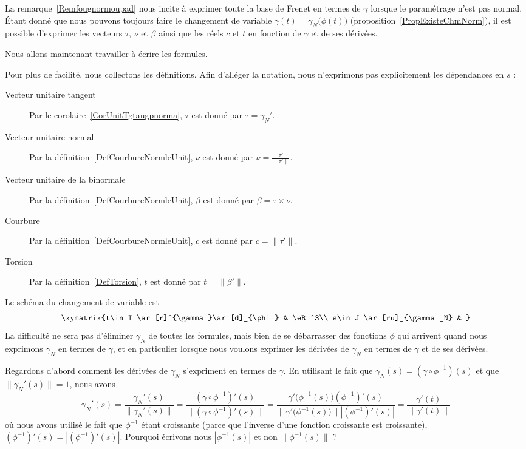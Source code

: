 La remarque~\ref{Remfougnormoupad} nous incite à exprimer toute la base de Frenet en termes de \( \gamma\) lorsque le paramétrage n'est pas normal. Étant donné que nous pouvons toujours faire le changement de variable \( \gamma(t)=\gamma_N\big( \phi(t) \big)\) (proposition~\ref{PropExisteChmNorm}), il est possible d'exprimer les vecteurs \( \tau\), \( \nu\) et \( \beta\) ainsi que les réels \( c\) et \( t\) en fonction de \( \gamma\) et de ses dérivées.

Nous allons maintenant travailler à écrire les formules.

Pour plus de facilité, nous collectons les définitions. Afin d'alléger la notation, nous n'exprimons pas explicitement les dépendances en \( s\) :
\begin{description}
	\item[Vecteur unitaire tangent]
	      Par le corolaire~\ref{CorUnitTgtaugpnorma}, \( \tau\) est donné par \( \tau=\gamma_N'\).
	\item[Vecteur unitaire normal]
	      Par la définition~\ref{DefCourbureNormleUnit}, \( \nu\) est donné par
	      \( \nu=\frac{ \tau' }{ \| \tau' \| }\).
	\item[Vecteur unitaire de la binormale]
	      Par la définition~\ref{DefCourbureNormleUnit}, \( \beta\) est donné par
	      \( \beta=\tau\times\nu\).
	\item[Courbure]
	      Par la définition~\ref{DefCourbureNormleUnit}, \( c\) est donné par
	      \( c=\| \tau' \|\).
	\item[Torsion]
	      Par la définition~\ref{DefTorsion}, \( t\) est donné par
	      \( t=\| \beta' \|\).
\end{description}


Le schéma du changement de variable est
\begin{equation}        \label{EqDiagIJstgvpR}
	\xymatrix{%
		t\in I \ar[r]^{\gamma}\ar[d]_{\phi}      &   \eR^3\\
		s\in J \ar[ru]_{\gamma_N}  &
	}
\end{equation}
La difficulté ne sera pas d'éliminer \( \gamma_N\) de toutes les formules, mais bien de se débarrasser des fonctions \( \phi\) qui arrivent quand nous exprimons \( \gamma_N\) en termes de \( \gamma\), et en particulier lorsque nous voulons exprimer les dérivées de \( \gamma_N\) en termes de \( \gamma\) et de ses dérivées.

Regardons d'abord comment les dérivées de \( \gamma_N\) s'expriment en termes de \( \gamma\). En utilisant le fait que \( \gamma_N(s)=(\gamma\circ\phi^{-1})(s)\) et que \( \| \gamma_N'(s) \|=1\), nous avons
\begin{equation}        \label{EqgpNgpnNnr}
	\gamma_N'(s)=\frac{ \gamma_N'(s) }{ \| \gamma_N'(s) \| }
	=\frac{ (\gamma\circ\phi^{-1})'(s) }{ \| (\gamma\circ\phi^{-1})'(s) \| }
	=\frac{ \gamma'\big( \phi^{-1}(s) \big)   (\phi^{-1})'(s)   }{ \| \gamma'\big( \phi^{-1}(s) \big) \|  |(\phi^{-1})'(s) |}
	=\frac{ \gamma'(t) }{ \| \gamma'(t) \| }
\end{equation}
où nous avons utilisé le fait que \( \phi^{-1}\) étant croissante (parce que l'inverse d'une fonction croissante est croissante), \( (\phi^{-1})'(s)=| (\phi^{-1})'(s) |\). Pourquoi écrivons nous \( | \phi^{-1}(s) |\) et non \( \| \phi^{-1}(s) \|\) ?

